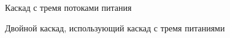 \begin{figure}[ht]
  \caption{Каскад с тремя потоками питания}\label{fig:3_inputs}
\end{figure}

\begin{figure}[ht]
  \caption{Двойной каскад, использующий каскад с тремя питаниями}\label{fig:double_3feeds}
\end{figure}


